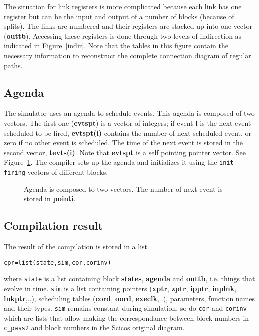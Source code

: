 \documentclass{book}
\begin{document}
The situation for link registers is more complicated because each link
has one register but can be the input and output of a number of blocks
(because of splits). The links are numbered and their registers are stacked up 
into one vector ({\bf outtb}). Accessing these registers is done through two
levels of indirection as indicated in Figure~\ref{indir}.
Note that the tables in this figure contain the necessary information
to reconstruct the complete connection diagram of regular paths. 

\subsection{Agenda}
The simulator uses an agenda to schedule events. This agenda is 
composed of two vectors. The first one ({\bf evtspt}) is a vector of
integers; if 
event {\bf i} is the next event scheduled to be fired, {\bf evtspt(i)}
contains the 
number of next scheduled event, or zero if no other event is scheduled.
The time of the next event is stored in the second vector, {\bf tevts(i)}.
Note that {\bf evtspt} is a self pointing pointer vector. See
Figure~\ref{poin}. 
The compiler sets up the agenda and initializes it using the {\tt init firing}
vectors of different blocks.


\begin{figure}[ht]

\caption{Agenda is composed to two vectors. The number of next event
is stored in {\bf pointi}.} 
\label{poin}
\end{figure}


\subsection{Compilation result}
The result of the compilation is stored in a list
\begin{verbatim}
cpr=list(state,sim,cor,corinv)
\end{verbatim}
where {\tt state} is a list containing block {\bf states}, {\bf
agenda} and {\bf outtb}, i.e. things that evolve in time. {\tt sim} is a list 
containing pointers ({\bf xptr}, {\bf zptr}, {\bf ipptr}, {\bf
inplnk}, {\bf lnkptr},..), 
scheduling tables ({\bf cord}, {\bf oord}, {\bf execlk},..),
parameters, function names and their types. {\tt sim} 
remains constant during simulation, so do {\tt cor} and {\tt corinv}
which are lists that allow 
making the correspondance between block numbers in {\tt c\_pass2} and
block numbers in the Scicos original diagram.
\end{document}
